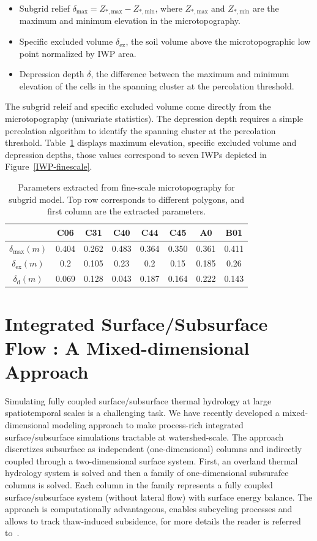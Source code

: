 \documentclass[review,11pt]{elsarticle}
\begin{document}
\begin{itemize}
\item Subgrid relief $\delta_\text{max} = Z_{*,\text{max}} -   Z_{*,\text{min}}$, where  $Z_{*,\text{max}}$ and  $Z_{*,\text{min}}$ are the maximum and minimum elevation in the microtopography. 
\item Specific excluded volume $\delta_\text{ex}$, the soil volume above the microtopographic low point normalized by IWP area.
\item Depression depth $\delta$, the difference between the maximum and minimum elevation of the cells in the spanning cluster at the percolation threshold.
\end{itemize}
The subgrid releif and specific excluded volume come directly from the microtopography (univariate statistics). The depression depth requires a simple percolation algorithm to identify the spanning cluster at the percolation threshold. Table~\ref{subgrid-para} displays maximum elevation, specific excluded volume and depression depths, those values correspond to seven IWPs depicted in Figure~\ref{IWP-finescale}.

\begin{center}
\begin{table}[htbp]
\caption{Parameters extracted from fine-scale microtopography for subgrid model. Top row corresponds to different polygons, and first column are the extracted parameters.}\label{subgrid-para}
\begin{tabular}{| c |c|c|c|c|c|c|c|}
\hline
& C06 & C31 & C40 & C44 & C45 & A0 & B01 \\ \hline
 $\delta_\text{max}(m)$ & 0.404 & 0.262 & 0.483 & 0.364 & 0.350 & 0.361 & 0.411 \\ \hline
$\delta_\text{ex}(m)$ & 0.2 & 0.105 & 0.23 & 0.2 & 0.15 & 0.185 & 0.26\\ \hline
$ \delta_\text{d}(m)$ & 0.069 & 0.128 & 0.043 & 0.187 & 0.164 & 0.222 & 0.143 \\ \hline
\end{tabular}

\end{table}
\end{center}
\section{Integrated Surface/Subsurface Flow : A Mixed-dimensional Approach}
Simulating fully coupled surface/subsurface thermal hydrology at large spatiotemporal scales is a challenging task. We have recently developed a mixed-dimensional modeling approach to make process-rich integrated surface/subsurface simulations tractable at watershed-scale. The approach discretizes subsurface as independent (one-dimensional) columns and indirectly coupled through a two-dimensional surface system. First, an overland thermal hydrology system is solved and then a family of one-dimensional subsurafce columns is solved. Each column in the family represents a fully coupled surface/subsurface system (without lateral flow) with surface energy balance. The approach is computationally advantageous, enables subcycling processes and allows to track thaw-induced subsidence, for more details the reader is referred to~\cite{jan2017}.
\end{document}
